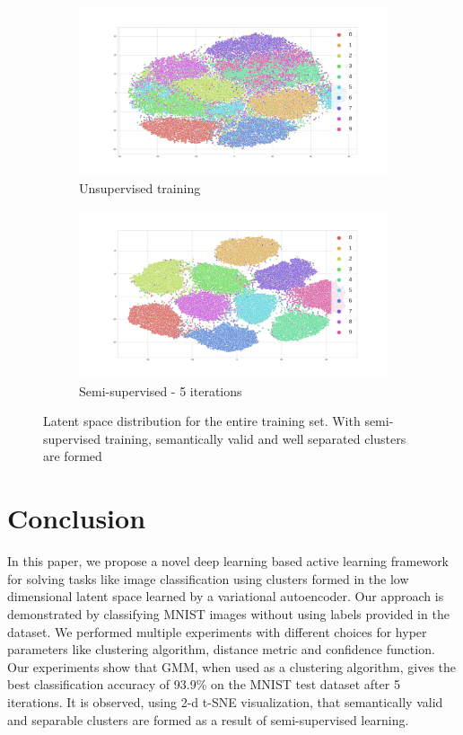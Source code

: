 \documentclass[runningheads]{llncs}
\begin{document}
\begin{figure}[!h]
\centering
\begin{subfigure}[t]{.4\textwidth}
  \centering
  \includegraphics[width=.8\linewidth]{images/tsne_unsup.jpg}
  \caption{Unsupervised training}
  \label{tsne_un}
\end{subfigure}\hfill
\begin{subfigure}[t]{.4\textwidth}
  \centering
  \includegraphics[width=.8\linewidth]{images/tsne_semi.jpg}
  \caption{Semi-supervised - 5 iterations }
  \label{tsne_semi}
\end{subfigure}
\caption{Latent space distribution for the entire training set. With semi-supervised training, semantically valid and well separated clusters are formed}
\label{tsne}
\end{figure}
\section{Conclusion}
In this paper, we propose a novel deep learning based active learning framework for solving tasks like image classification using clusters formed in the low dimensional latent space learned by a variational autoencoder.
Our approach is demonstrated by classifying MNIST images without using labels provided in the dataset.
We performed multiple experiments with different choices for hyper parameters like clustering algorithm, distance metric and confidence function.
Our experiments show that GMM, when used as a clustering algorithm,  gives the best classification accuracy of 93.9\% on the MNIST test dataset after 5 iterations.
It is observed, using 2-d t-SNE visualization, that  semantically valid and separable clusters are formed as a result of semi-supervised learning.
\end{document}
